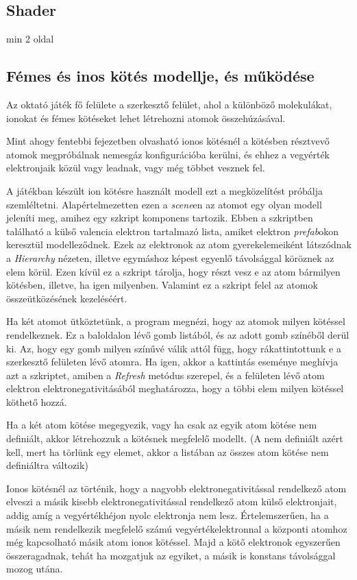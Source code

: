 \documentclass[colorlinks]{thesis-ekf}
\theoremstyle{definition}
\theoremstyle{remark}
\begin{document}
\subsection{Shader}
min 2 oldal
\subsection{Fémes és inos kötés modellje, és működése}
Az oktató játék fő felülete a szerkesztő felület, ahol a különböző molekulákat, ionokat és fémes kötéseket lehet létrehozni atomok összehúzásával.

Mint ahogy fentebbi fejezetben olvasható ionos kötésnél a kötésben résztvevő atomok megpróbálnak nemesgáz konfigurációba kerülni, és ehhez a vegyérték elektronjaik közül vagy leadnak, vagy még többet vesznek fel.

A játékban készült ion kötésre használt modell ezt a megközelítést próbálja szemléltetni. Alapértelmezetten ezen a \textit{scene}en az atomot egy olyan modell jeleníti meg, amihez egy szkript komponens tartozik. Ebben a szkriptben található a külső valencia elektron tartalmazó lista, amiket elektron\textit{ prefab}okon keresztül modelleződnek. Ezek az elektronok az atom gyerekelemeiként látszódnak a \textit{Hierarchy} nézeten, illetve egymáshoz képest egyenlő távolsággal köröznek az elem körül. Ezen kívül ez a szkript tárolja, hogy részt vesz e az atom bármilyen kötésben, illetve, ha igen milyenben. Valamint ez a szkript felel az atomok összeütközésének kezeléséért.

Ha két atomot ütköztetünk, a program megnézi, hogy az atomok milyen kötéssel rendelkeznek. Ez a baloldalon lévő gomb listából, és az adott gomb színéből derül ki. Az, hogy egy gomb milyen színűvé válik attól függ, hogy rákattintottunk e a szerkesztő felületen lévő atomra. Ha igen, akkor a kattintás eseménye meghívja azt a szkriptet, amiben a \textit{Refresh} metódus szerepel, és a felületen lévő atom elektron elektronegativitásából meghatározza, hogy a többi elem milyen kötéssel köthető hozzá.

Ha a két atom kötése megegyezik, vagy ha csak az egyik atom kötése nem definiált, akkor létrehozzuk a kötésnek megfelelő modellt. (A nem definiált azért kell, mert ha törlünk egy elemet, akkor a listában az összes atom kötése nem definiáltra változik)

Ionos kötésnél az történik, hogy a nagyobb elektronegativitással rendelkező atom elveszi a másik kisebb elektronegativitással rendelkező atom külső elektronjait, addig amíg a vegyértékhéjon nyolc elektronja nem lesz. Értelemszerűen, ha a másik nem rendelkezik megfelelő számú vegyértékelektronnal a központi atomhoz még kapcsolható másik atom ionos kötéssel. Majd a kötő elektronok egyszerűen összeragadnak, tehát ha mozgatjuk az egyiket, a másik is konstans távolsággal mozog utána.
\end{document}
